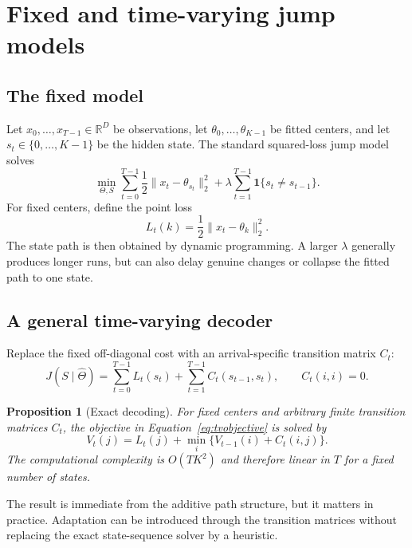 \documentclass[11pt]{article}
\newcommand{\ind}{\mathbf{1}}
\newtheorem{proposition}{Proposition}
\begin{document}
\section{Fixed and time-varying jump models}

\subsection{The fixed model}

Let $x_0,\ldots,x_{T-1}\in\mathbb{R}^D$ be observations, let $\theta_0,\ldots,\theta_{K-1}$ be fitted centers, and let $s_t\in\{0,\ldots,K-1\}$ be the hidden state. The standard squared-loss jump model solves
\begin{equation}
\min_{\Theta,S}\sum_{t=0}^{T-1}\frac{1}{2}\lVert x_t-\theta_{s_t}\rVert_2^2
+\lambda\sum_{t=1}^{T-1}\ind\{s_t\neq s_{t-1}\}.
\label{eq:fixed}
\end{equation}
For fixed centers, define the point loss
\begin{equation}
L_t(k)=\frac{1}{2}\lVert x_t-\theta_k\rVert_2^2.
\end{equation}
The state path is then obtained by dynamic programming. A larger $\lambda$ generally produces longer runs, but can also delay genuine changes or collapse the fitted path to one state.

\subsection{A general time-varying decoder}

Replace the fixed off-diagonal cost with an arrival-specific transition matrix $C_t$:
\begin{equation}
J(S\mid\hat\Theta)=\sum_{t=0}^{T-1}L_t(s_t)
+\sum_{t=1}^{T-1}C_t(s_{t-1},s_t),
\qquad C_t(i,i)=0.
\label{eq:tvobjective}
\end{equation}

\begin{proposition}[Exact decoding]
For fixed centers and arbitrary finite transition matrices $C_t$, the objective in Equation~\eqref{eq:tvobjective} is solved by
\begin{equation}
V_t(j)=L_t(j)+\min_i\{V_{t-1}(i)+C_t(i,j)\}.
\label{eq:dp}
\end{equation}
The computational complexity is $O(TK^2)$ and therefore linear in $T$ for a fixed number of states.
\end{proposition}

The result is immediate from the additive path structure, but it matters in practice. Adaptation can be introduced through the transition matrices without replacing the exact state-sequence solver by a heuristic.
\end{document}
